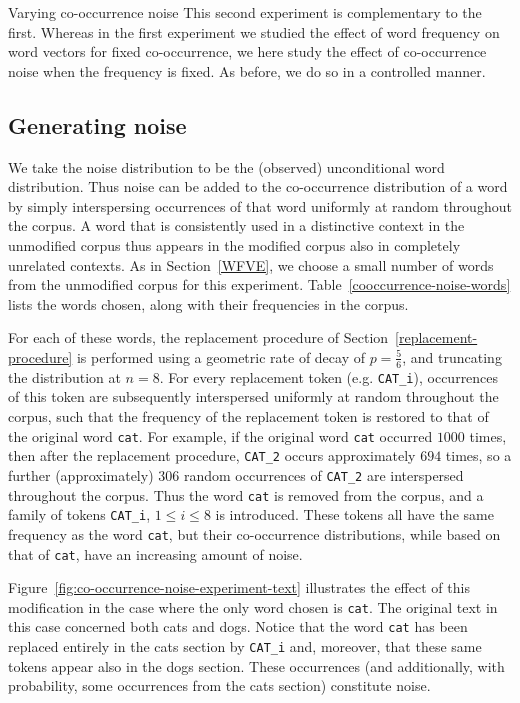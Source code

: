 \documentclass{article} %
\newcommand{\word}[1]{\texttt{#1}}
\begin{document}
\begin{section}{Varying co-occurrence noise}\label{CNVE}
This second experiment is complementary to the first.  Whereas in the
first experiment we studied the effect of word frequency on word vectors
for fixed co-occurrence, we here study the effect of co-occurrence noise
when the frequency is fixed.  As before, we do so in a controlled
manner.
  
\subsection{Generating noise}
We take the noise distribution to be the (observed) unconditional word
distribution.  Thus noise can be added to the co-occurrence distribution
of a word by simply interspersing occurrences of that word uniformly at
random throughout the corpus.  A word that is consistently used in a
distinctive context in the unmodified corpus thus appears in the
modified corpus also in completely unrelated contexts.  As in
Section~\ref{WFVE}, we choose a small number of words from the
unmodified corpus for this experiment.
Table~\ref{cooccurrence-noise-words} lists the words chosen, along with
their frequencies in the corpus.

For each of these words, the replacement procedure of
Section~\ref{replacement-procedure} is performed using a geometric rate
of decay of $p = \tfrac{5}{6}$, and truncating the distribution at
$n=8$.  For every replacement token (e.g. \word{CAT\_i}), occurrences of
this token are subsequently interspersed uniformly at random throughout
the corpus, such that the frequency of the replacement token is restored
to that of the original word \word{cat}.  For example, if the original
word \word{cat} occurred $1000$ times, then after the replacement
procedure, \word{CAT\_2} occurs approximately $694$ times, so a further
(approximately) $306$ random occurrences of \word{CAT\_2} are
interspersed throughout the corpus.  Thus the word \word{cat} is removed
from the corpus, and a family of tokens \word{CAT\_i}, $1 \leqslant i
\leqslant 8$ is introduced.  These tokens all have the same frequency as
the word \word{cat}, but their co-occurrence distributions, while based
on that of \word{cat}, have an increasing amount of noise.

Figure~\ref{fig:co-occurrence-noise-experiment-text} illustrates the
effect of this modification in the case where the only word chosen is
\word{cat}.  The original text in this case concerned both cats and
dogs.  Notice that the word \word{cat} has been replaced entirely in the
cats section by \word{CAT\_i} and, moreover, that these same tokens
appear also in the dogs section. These occurrences (and additionally,
with probability, some occurrences from the cats section) constitute
noise.


\end{section}
\end{document}
